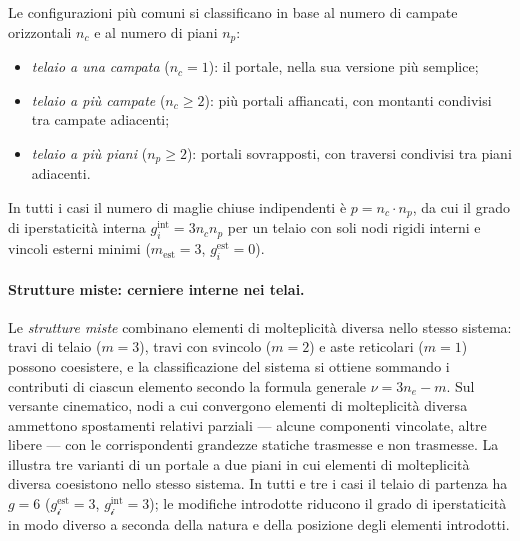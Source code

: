 Le configurazioni più comuni si classificano
in base al numero di campate orizzontali
$n_c$ e al numero di piani $n_p$:

\begin{itemize}
	\item \emph{telaio a una campata} ($n_c = 1$):
	il portale, nella sua versione più semplice;
	
	\item \emph{telaio a più campate}
	($n_c \geq 2$): più portali affiancati,
	con montanti condivisi tra campate adiacenti;
	
	\item \emph{telaio a più piani}
	($n_p \geq 2$): portali sovrapposti,
	con traversi condivisi tra piani adiacenti.
\end{itemize}

In tutti i casi il numero di maglie chiuse
indipendenti è $p = n_c \cdot n_p$, da cui
il grado di iperstaticità interna
$g_i^{\text{int}} = 3n_c n_p$ per un telaio
con soli nodi rigidi interni e vincoli
esterni minimi ($m_{\text{est}} = 3$,
$g_i^{\text{est}} = 0$).



\paragraph{Strutture miste: cerniere interne nei telai.}
Le \emph{strutture miste} combinano elementi di
molteplicità diversa nello stesso sistema: travi
di telaio ($m = 3$), travi con svincolo ($m = 2$)
e aste reticolari ($m = 1$) possono coesistere,
e la classificazione del sistema si ottiene
sommando i contributi di ciascun elemento secondo
la formula generale $\nu = 3n_e - m$.
Sul versante cinematico, nodi a cui convergono
elementi di molteplicità diversa ammettono
spostamenti relativi parziali --- alcune componenti
vincolate, altre libere --- con le corrispondenti
grandezze statiche trasmesse e non trasmesse.
La  illustra tre
varianti di un portale a due piani in cui elementi
di molteplicità diversa coesistono nello stesso
sistema. In tutti e tre i casi il telaio di
partenza ha $g = 6$ ($g_{\mathscr{i}}^{\text{est}}
= 3$, $g_{\mathscr{i}}^{\text{int}} = 3$);
le modifiche introdotte riducono il grado di
iperstaticità in modo diverso a seconda della
natura e della posizione degli elementi introdotti.

